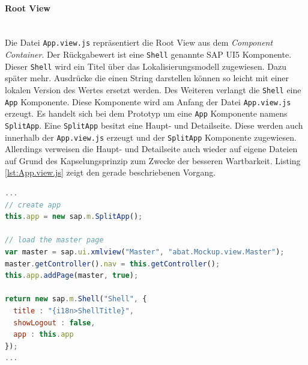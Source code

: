 \paragraph{Root View}$\;$ \\
Die Datei \texttt{App.view.js} repräsentiert die Root View aus dem \textit{Component Container}. Der Rückgabewert ist eine \texttt{Shell} genannte SAP UI5 Komponente. Dieser \texttt{Shell} wird ein Titel über das Lokalisierungsmodell zugewiesen. Dazu später mehr. Ausdrücke die einen String darstellen können so leicht mit einer lokalen Version des Wertes ersetzt werden. Des Weiteren verlangt die \texttt{Shell} eine \texttt{App} Komponente. Diese Komponente wird am Anfang der Datei \texttt{App.view.js} erzeugt. Es handelt sich bei dem Prototyp um eine \texttt{App} Komponente namens \texttt{SplitApp}. Eine \texttt{SplitApp} besitzt eine Haupt- und Detailseite. Diese werden auch innerhalb der \texttt{App.view.js} erzeugt und der \texttt{SplitApp} Komponente zugewiesen. Allerdings verweisen die Haupt- und Detailseite auch wieder auf eigene Dateien auf Grund des Kapselungsprinzip zum Zwecke der besseren Wartbarkeit. Listing \ref{lst:App.view.js} zeigt den gerade beschriebenen Vorgang.

\vspace{1em}
\begin{lstlisting}[language=JavaScript, caption=Root View der Applikation, label=lst:App.view.js]
...
// create app
this.app = new sap.m.SplitApp();

// load the master page
var master = sap.ui.xmlview("Master", "abat.Mockup.view.Master");
master.getController().nav = this.getController();
this.app.addPage(master, true);

return new sap.m.Shell("Shell", {
  title : "{i18n>ShellTitle}",
  showLogout : false,
  app : this.app
});
...
\end{lstlisting}
	
